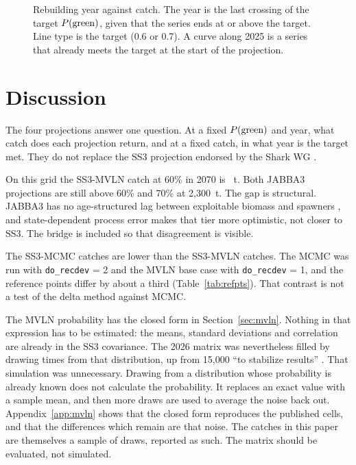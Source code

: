 \documentclass[11pt,a4paper]{article}
\begin{document}
\begin{figure}[H]
  \centering
  \caption{Rebuilding year against catch. The year is the last crossing of
    the target $P(\mathrm{green})$, given that the series ends at or above the target.
    Line type is the target (0.6 or 0.7). A curve along 2025 is a series
    that already meets the target at the start of the projection.}
  \label{fig:rebuild}
\end{figure}

\section{Discussion}

The four projections answer one question. At a fixed $P(\mathrm{green})$ and year, what
catch does each projection return, and at a fixed catch, in what year is
the target met. They do not replace the SS3 projection endorsed by the
Shark WG \citep{Liniers2026}.

On this grid the SS3-MVLN catch at 60\% in 2070 is \tacMvlnSeventySixty~t.
Both JABBA3 projections are still above 60\% and 70\% at 2{,}300~t. The gap
is structural. JABBA3 has no age-structured lag between exploitable biomass
and spawners \citep{Winker2020SMA}, and state-dependent process error makes
that tier more optimistic, not closer to SS3. The bridge is included so
that disagreement is visible.

The SS3-MCMC catches are lower than the SS3-MVLN catches. The MCMC was run
with \texttt{do\_recdev} = 2 and the MVLN base case with
\texttt{do\_recdev} = 1, and the reference points differ by about a third
(Table~\ref{tab:refpts}). That contrast is not a test of the delta method
against MCMC.

The MVLN probability has the closed form in Section~\ref{sec:mvln}. Nothing
in that expression has to be estimated: the means, standard deviations and
correlation are already in the SS3 covariance. The 2026 matrix was
nevertheless filled by drawing \linN{} times from that distribution, up
from 15{,}000 ``to stabilize results'' \citep{Liniers2026}. That simulation
was unnecessary. Drawing from a distribution whose probability is already
known does not calculate the probability. It replaces an exact value with a
sample mean, and then more draws are used to average the noise back out.
Appendix~\ref{app:mvln} shows that the closed form reproduces the published
cells, and that the differences which remain are that noise. The catches in
this paper are themselves a sample of \nDraw{} draws, reported as such.
The matrix should be evaluated, not simulated.
\end{document}
